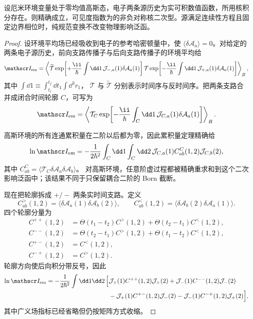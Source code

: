 \begin{proposition}[线性高斯环境的可见度二次型]
设厄米环境变量处于零均值高斯态，电子两条源历史为实可积数值函数，所用核积分存在。则精确成立，可见度指数为的非负对称核二次型。源满足连续性方程且固定边界相位时，纯规范变换不改变物理影响泛函。
\end{proposition}
\begin{proof}
设环境平均场已经吸收到电子的参考哈密顿量中，使
$\langle\delta\mathcal A_a\rangle=0$。对给定的两条电子源历史，前向支路传播子与后向支路传播子的环境平均给
\[
\mathscr I_{\rm em}
=\left\langle
\widetilde{\mathcal T}
\exp\!\left[
+\frac{\ii}{\hbar}\int\dd1\,
\mathcal J_{-,a}(1)\delta\mathcal A_a(1)
\right]
\mathcal T
\exp\!\left[
-\frac{\ii}{\hbar}\int\dd1\,
\mathcal J_{+,a}(1)\delta\mathcal A_a(1)
\right]
\right\rangle_B,
\]
其中
$\int\dd1\equiv\int_{t_i}^{t_f}\dd t_1\int\dd^3r_1$，
$\mathcal T$ 与 $\widetilde{\mathcal T}$ 分别表示时间序与反时间序。把两条支路合并成闭合时间轮廓 $C$，可写为
\[
\mathscr I_{\rm em}
=\left\langle
\mathcal T_C
\exp\!\left[
-\frac{\ii}{\hbar}
\int_C\dd1\,
\mathcal J_{C,a}(1)\delta\mathcal A_a(1)
\right]
\right\rangle_B.
\]

高斯环境的所有连通累积量在二阶以后都为零，因此累积量定理精确给
\begin{equation*}
\ln\mathscr I_{\rm em}
=-\frac1{2\hbar^2}
\int_C\dd1\int_C\dd2\,
\mathcal J_{C,a}(1)
C^{C}_{ab}(1,2)
\mathcal J_{C,b}(2),
\end{equation*}
其中
$C^C_{ab}=\langle\mathcal T_C\delta\mathcal A_a\delta\mathcal A_b\rangle$。
对高斯环境，任意阶虚过程都被精确重求和到这个二次影响泛函中；该结果不同于只保留耦合二阶的 Born 截断。

现在把轮廓拆成 $+/-$ 两条实时间支路。定义
\[
C^>_{ab}(1,2)
=\langle\delta\mathcal A_a(1)\delta\mathcal A_b(2)\rangle,
\qquad
C^<_{ab}(1,2)
=\langle\delta\mathcal A_b(2)\delta\mathcal A_a(1)\rangle.
\]
四个轮廓分量为
\begin{align*}
C^{++}(1,2)
&=\Theta(t_1-t_2)C^>(1,2)
+\Theta(t_2-t_1)C^<(1,2),\\
C^{--}(1,2)
&=\Theta(t_2-t_1)C^>(1,2)
+\Theta(t_1-t_2)C^<(1,2),\\
C^{+-}(1,2)&=C^<(1,2),\\
C^{-+}(1,2)&=C^>(1,2).
\end{align*}
轮廓方向使后向积分带反号，因此
\begin{align*}
\ln\mathscr I_{\rm em}
=-\frac1{2\hbar^2}\int\dd1\dd2\,
\Big[
&\mathcal J_+(1)C^{++}(1,2)\mathcal J_+(2)
+\mathcal J_-(1)C^{--}(1,2)\mathcal J_-(2)\\
&-\mathcal J_+(1)C^{+-}(1,2)\mathcal J_-(2)
-\mathcal J_-(1)C^{-+}(1,2)\mathcal J_+(2)
\Big],
\end{align*}
其中广义场指标已经省略但仍按矩阵方式收缩。


\end{proof}
